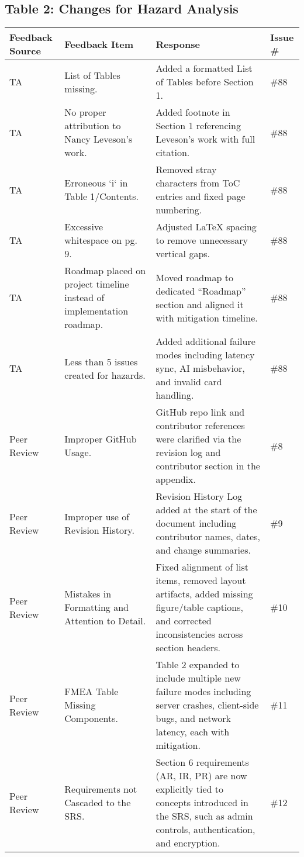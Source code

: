 \documentclass{article}
\begin{document}
\subsection*{Table 2: Changes for Hazard Analysis}
\begin{longtable}{|p{2cm}|p{5cm}|p{5cm}|p{2cm}|}
\hline
\textbf{Feedback Source} & \textbf{Feedback Item} & \textbf{Response} & \textbf{Issue \#} \\
\hline
TA & List of Tables missing. & Added a formatted List of Tables before Section 1. & \#88 \\
\hline
TA & No proper attribution to Nancy Leveson's work. & Added footnote in Section 1 referencing Leveson’s work with full citation. & \#88 \\
\hline
TA & Erroneous `i` in Table 1/Contents. & Removed stray characters from ToC entries and fixed page numbering. & \#88 \\
\hline
TA & Excessive whitespace on pg. 9. & Adjusted LaTeX spacing to remove unnecessary vertical gaps. & \#88 \\
\hline
TA & Roadmap placed on project timeline instead of implementation roadmap. & Moved roadmap to dedicated “Roadmap” section and aligned it with mitigation timeline. & \#88 \\
\hline
TA & Less than 5 issues created for hazards. & Added additional failure modes including latency sync, AI misbehavior, and invalid card handling. & \#88 \\
\hline
Peer Review & Improper GitHub Usage. & GitHub repo link and contributor references were clarified via the revision log and contributor section in the appendix. & \#8 \\
\hline
Peer Review & Improper use of Revision History. & Revision History Log added at the start of the document including contributor names, dates, and change summaries. & \#9 \\
\hline
Peer Review & Mistakes in Formatting and Attention to Detail. & Fixed alignment of list items, removed layout artifacts, added missing figure/table captions, and corrected inconsistencies across section headers. & \#10 \\
\hline
Peer Review & FMEA Table Missing Components. & Table 2 expanded to include multiple new failure modes including server crashes, client-side bugs, and network latency, each with mitigation. & \#11 \\
\hline
Peer Review & Requirements not Cascaded to the SRS. & Section 6 requirements (AR, IR, PR) are now explicitly tied to concepts introduced in the SRS, such as admin controls, authentication, and encryption. & \#12 \\

\end{longtable}
\end{document}
